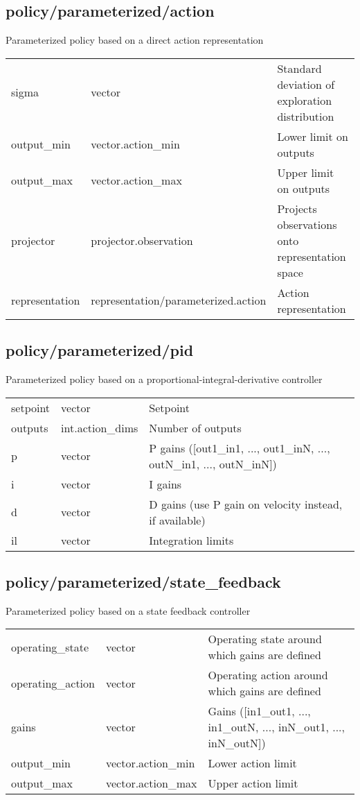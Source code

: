 \subsection{policy/parameterized/action}
\noindent Parameterized policy based on a direct action representation\\

\noindent\begin{tabular}{@{}lll@{}}
sigma&vector&Standard deviation of exploration distribution\\
output\_min&vector.action\_min&Lower limit on outputs\\
output\_max&vector.action\_max&Upper limit on outputs\\
projector&projector.observation&Projects observations onto representation space\\
representation&representation/parameterized.action&Action representation\\
\end{tabular}
\subsection{policy/parameterized/pid}
\noindent Parameterized policy based on a proportional-integral-derivative controller\\

\noindent\begin{tabular}{@{}lll@{}}
setpoint&vector&Setpoint\\
outputs&int.action\_dims&Number of outputs\\
p&vector&P gains ([out1\_in1, ..., out1\_inN, ..., outN\_in1, ..., outN\_inN])\\
i&vector&I gains\\
d&vector&D gains (use P gain on velocity instead, if available)\\
il&vector&Integration limits\\
\end{tabular}
\subsection{policy/parameterized/state\_feedback}
\noindent Parameterized policy based on a state feedback controller\\

\noindent\begin{tabular}{@{}lll@{}}
operating\_state&vector&Operating state around which gains are defined\\
operating\_action&vector&Operating action around which gains are defined\\
gains&vector&Gains ([in1\_out1, ..., in1\_outN, ..., inN\_out1, ..., inN\_outN])\\
output\_min&vector.action\_min&Lower action limit\\
output\_max&vector.action\_max&Upper action limit\\
\end{tabular}
